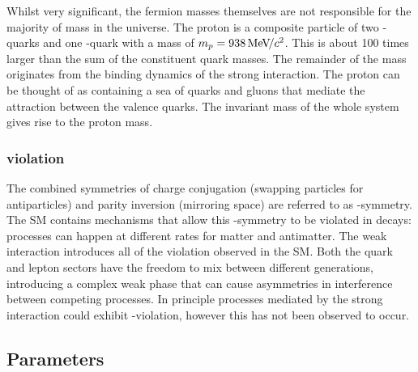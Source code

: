 
Whilst very significant, the fermion masses themselves are not responsible for the majority of mass in the universe. The proton is a composite particle of two \uquark-quarks and one \dquark-quark with a mass of $m_{{p}}=938{\mathrm{\,Me\kern -0.1em V\!/}c^2}$. This is about 100 times larger than the sum of the constituent quark masses. The remainder of the mass originates from the  binding dynamics of the strong interaction. The proton can be thought of as containing a sea of quarks and gluons that mediate the attraction between the valence quarks. The invariant mass of the whole system gives rise to the proton mass. 
 

\subsubsection{\CP violation}

The combined symmetries of charge conjugation (swapping particles for antiparticles) and parity inversion (mirroring space) are referred to as \CP-symmetry. The SM contains mechanisms that allow this \CP-symmetry to be violated in decays: processes can happen at different rates for matter and antimatter.  
The weak interaction introduces all of the \CP violation observed in the SM. Both the quark and lepton sectors have the freedom to mix between different generations, introducing a complex weak phase that can cause asymmetries in interference between competing processes. In principle processes mediated by the strong interaction could exhibit \CP-violation, however this has not been observed to occur. 

\subsection{Parameters}

